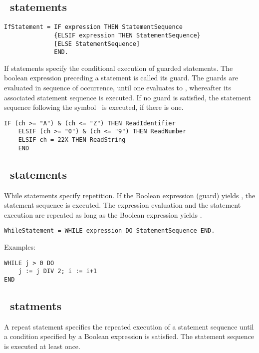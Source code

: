\documentclass[12pt]{article}
\begin{document}
\subsection{\IF\ statements}

\begin{lstlisting}[style=ebnf]
IfStatement = IF expression THEN StatementSequence 
              {ELSIF expression THEN StatementSequence} 
              [ELSE StatementSequence]
              END.
\end{lstlisting} 

If statements specify the conditional execution of guarded statements. The boolean expression preceding a statement is called its guard. The guards are evaluated in sequence of occurrence, until one evaluates to \TRUE, whereafter its associated statement sequence is executed. If no guard is satisfied, the statement sequence following the symbol \ELSE\ is executed, if there is one.

\begin{lstlisting}[style=example]
    IF (ch >= "A") & (ch <= "Z") THEN ReadIdentifier 
    ELSIF (ch >= "0") & (ch <= "9") THEN ReadNumber 
    ELSIF ch = 22X THEN ReadString
    END
\end{lstlisting} 

\subsection{\WHILE\ statements}

While statements specify repetition. If the Boolean expression (guard) yields \TRUE, the statement sequence is executed. The expression evaluation and the statement execution are repeated as long as the Boolean expression yields \TRUE.

\begin{lstlisting}[style=ebnf]
WhileStatement = WHILE expression DO StatementSequence END.
\end{lstlisting} 
    
Examples:
    
\begin{lstlisting}[style=example]
WHILE j > 0 DO
    j := j DIV 2; i := i+1
END
\end{lstlisting} 

\subsection{\REPEAT\ statments}

A repeat statement specifies the repeated execution of a statement sequence until a condition specified by a Boolean expression is satisfied. The statement sequence is executed at least once.
\end{document}
